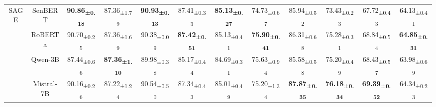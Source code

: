 \begin{table*}[!h]
{\begin{tabular}{cc|cccccccccc}
    \multirow{4}{*}{SAGE} & SenBERT & \cellcolor{blue!10} \textbf{90.86\textsubscript{±0.18}} & 87.36\textsubscript{±1.79} & \cellcolor{blue!10} \textbf{90.93\textsubscript{±0.13}} & 87.41\textsubscript{±0.33} & \cellcolor{blue!10} \textbf{85.13\textsubscript{±0.27}} & 74.73\textsubscript{±0.67} & 85.94\textsubscript{±0.52} & 73.43\textsubscript{±0.23} & 67.72\textsubscript{±0.43} & 64.13\textsubscript{±0.41} \\ 
     & RoBERTa & 90.70\textsubscript{±0.25} & 87.36\textsubscript{±1.69} & 90.38\textsubscript{±0.09} & \cellcolor{blue!10} \textbf{87.42\textsubscript{±0.51}} & 85.13\textsubscript{±0.41} & \cellcolor{blue!10} \textbf{75.90\textsubscript{±0.41}} & 86.31\textsubscript{±0.68} & 75.28\textsubscript{±0.31} & 68.84\textsubscript{±0.54} & \cellcolor{blue!10}  \textbf{64.85\textsubscript{±0.31}} \\
    & Qwen-3B & 87.44\textsubscript{±0.66} & \cellcolor{blue!10} \textbf{87.36\textsubscript{±1.10}} & 89.98\textsubscript{±0.38} & 85.17\textsubscript{±0.44}  & 84.69\textsubscript{±0.31} & 75.63\textsubscript{±0.94} & 85.58\textsubscript{±0.58} & 75.20\textsubscript{±0.49} & 68.43\textsubscript{±0.57} & 63.98\textsubscript{±0.69} \\ 
    & Mistral-7B & 90.16\textsubscript{±0.26} & 87.22\textsubscript{±1.24} & 90.54\textsubscript{±0.50} & 87.34\textsubscript{±0.43} & 85.01\textsubscript{±0.49} & 75.20\textsubscript{±1.34} & \cellcolor{blue!10} \textbf{87.87\textsubscript{±0.35}} & \cellcolor{blue!10} \textbf{76.18\textsubscript{±0.34}} & \cellcolor{blue!10} \textbf{69.39\textsubscript{±0.52}} & 64.34\textsubscript{±0.23} \\ 

    \bottomrule
    \end{tabular}
    }
    \label{tab:encoder_comp_fullysupervised}
\end{table*}






